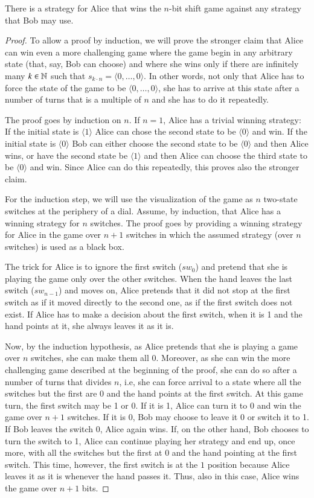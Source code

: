 \documentclass[final,12pt]{elsarticle}
\theoremstyle{definition} \newtheorem{definition}[theorem]{Definition} \newtheorem{observation}[theorem]{Observation} \newtheorem{example}[theorem]{Example} \newtheorem{remark}[theorem]{Remark} \newtheorem{corrolary}[theorem]{Corrolary}
\newcommand{\T}[1]{\langle{#1}\rangle} \DeclareMathOperator{\drop}{drop} \DeclareMathOperator{\dropbits}{drop\_bits} \DeclareMathOperator{\dropstates}{drop\_states} \DeclareMathOperator{\leadingForm}{LeadingForm} \DeclareMathOperator{\dv}{div} %
\begin{document}
\begin{proposition}
	There is a strategy for Alice that wins the $n$-bit shift game against any strategy that Bob may use.
\end{proposition}
\begin{proof}
	To allow a proof by induction, we will prove the stronger claim that Alice can win even a more challenging game where the game begin in any arbitrary state (that, say, Bob can choose) and where she wins only if there are infinitely many $k \in {\mathbb{N}}$ such that $s_{k \cdot n} = \langle 0, \dots, 0\rangle$. In other words, not only that Alice has to force the state of the game to be $\langle 0, \dots, 0\rangle$, she has to arrive at this state after a number of turns that is a multiple of $n$ and she has to do it repeatedly.

	The proof goes by induction on $n$. If $n=1$, Alice has a trivial winning strategy: If the initial state is $ \T{1}$ Alice can chose the second state to be $ \T{0}$ and win. If the initial state is $ \T{0}$ Bob can either choose the second state to be $ \T{0}$ and then Alice wins, or have the second state be $ \T{1}$ and then Alice can choose the third state to be $ \T{0}$ and win. Since Alice can do this repeatedly, this proves also the stronger claim.

	For the induction step, we will use the visualization of the game as $n$ two-state switches at the periphery of a dial. Assume, by induction, that Alice has a winning strategy for $n$ switches. The proof goes by providing a winning strategy for Alice in the game over $n+1$ switches in which the assumed strategy (over $n$ switches) is used as a black box.

	The trick for Alice is to ignore the first switch ($sw_0$) and pretend that she is playing the game only over the other switches. When the hand leaves the last switch ($sw_{n-1}$) and moves on, Alice pretends that it did not stop at the first switch as if it moved directly to the second one, as if the first switch does not exist. If Alice has to make a decision about the first switch, when it is 1 and the hand points at it, she always leaves it as it is.

	Now, by the induction hypothesis, as Alice pretends that she is playing a game over $n$ switches, she can make them all 0. Moreover, as she can win the more challenging game described at the beginning of the proof, she can do so after a number of turns that divides $n$, i.e, she can force arrival to a state where all the switches but the first are 0 and the hand points at the first switch. At this game turn, the first switch may be 1 or 0. If it is 1, Alice can turn it to 0 and win the game over $n+1$ switches. If it is 0, Bob may choose to leave it 0 or switch it to 1. If Bob leaves the switch 0, Alice again wins. If, on the other hand, Bob chooses to turn the switch to 1, Alice can continue playing her strategy and end up, once more, with all the switches but the first at $0$ and the hand pointing at the first switch. This time, however, the first switch is at the $1$ position because Alice leaves it as it is whenever the hand passes it. Thus, also in this case, Alice wins the game over $n+1$ bits.
\end{proof}
\end{document}

